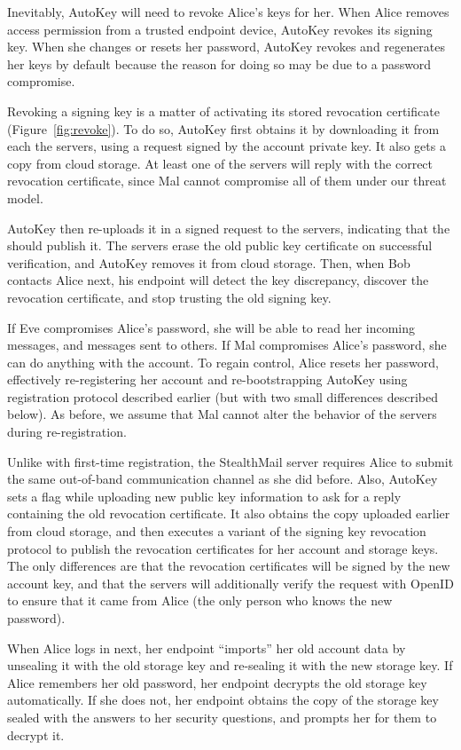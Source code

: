 Inevitably, AutoKey will need to revoke Alice’s keys for her.  When Alice removes access permission from a trusted endpoint device, AutoKey revokes its signing key.  When she changes or resets her password, AutoKey revokes and regenerates her keys by default because the reason for doing so may be due to a password compromise.

Revoking a signing key is a matter of activating its stored revocation certificate (Figure~\ref{fig:revoke}).  To do so, AutoKey first obtains it by downloading it from each the servers, using a request signed by the account private key.  It also gets a copy from cloud storage.  At least one of the servers will reply with the correct revocation certificate, since Mal cannot compromise all of them under our threat model.

AutoKey then re-uploads it in a signed request to the servers, indicating that the should publish it.  The servers erase the old public key certificate on successful verification, and AutoKey removes it from cloud storage.  Then, when Bob contacts Alice next, his endpoint will detect the key discrepancy, discover the revocation certificate, and stop trusting the old signing key.

If Eve compromises Alice’s password, she will be able to read her incoming messages, and messages sent to others.  If Mal compromises Alice’s password, she can do anything with the account.  To regain control, Alice resets her password, effectively re-registering her account and re-bootstrapping AutoKey using registration protocol described earlier (but with two small differences described below).  As before, we assume that Mal cannot alter the behavior of the servers during re-registration.

Unlike with first-time registration, the StealthMail server requires Alice to submit the same out-of-band communication channel as she did before.  Also, AutoKey sets a flag while uploading new public key information to ask for a reply containing the old revocation certificate.  It also obtains the copy uploaded earlier from cloud storage, and then executes a variant of the signing key revocation protocol to publish the revocation certificates for her account and storage keys.  The only differences are that the revocation certificates will be signed by the new account key, and that the servers will additionally verify the request with OpenID to ensure that it came from Alice (the only person who knows the new password).

When Alice logs in next, her endpoint ``imports'' her old account data by unsealing it with the old storage key and re-sealing it with the new storage key.  If Alice remembers her old password, her endpoint decrypts the old storage key automatically.  If she does not, her endpoint obtains the copy of the storage key sealed with the answers to her security questions, and prompts her for them to decrypt it.

